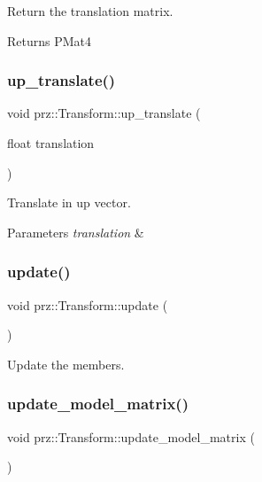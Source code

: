 Return the translation matrix. 

\begin{DoxyReturn}{Returns}
P\+Mat4 
\end{DoxyReturn}
\mbox{\label{classprz_1_1_transform_aa43ec7c6cd3a915c79c32b092dd54a34}} 
\subsubsection{\texorpdfstring{up\_translate()}{up\_translate()}}
{\footnotesize\ttfamily void prz\+::\+Transform\+::up\+\_\+translate (\begin{DoxyParamCaption}\item[{float}]{translation }\end{DoxyParamCaption})}



Translate in up vector. 


\begin{DoxyParams}{Parameters}
{\em translation} & \\
\hline
\end{DoxyParams}
\mbox{\label{classprz_1_1_transform_af49227fa642fc433c6d1344dc0eebc18}} 
\subsubsection{\texorpdfstring{update()}{update()}}
{\footnotesize\ttfamily void prz\+::\+Transform\+::update (\begin{DoxyParamCaption}{ }\end{DoxyParamCaption})\hspace{0.3cm}{\ttfamily [inline]}}



Update the members. 

\mbox{\label{classprz_1_1_transform_a9c1c93dfd49898aa0d1241036daef430}} 
\subsubsection{\texorpdfstring{update\_model\_matrix()}{update\_model\_matrix()}}
{\footnotesize\ttfamily void prz\+::\+Transform\+::update\+\_\+model\+\_\+matrix (\begin{DoxyParamCaption}{ }\end{DoxyParamCaption})\hspace{0.3cm}{\ttfamily [protected]}}



